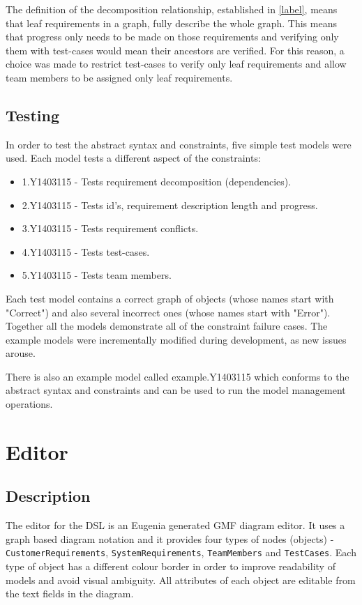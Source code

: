 \documentclass[11pt,a4paper]{article}
\begin{document}
	The definition of the decomposition relationship, established in \autoref{label}, means that leaf requirements in a graph, fully describe the whole graph. This means that progress only needs to be made on those requirements and verifying only them with test-cases would mean their ancestors are verified. For this reason, a choice was made to restrict test-cases to verify only leaf requirements and allow team members to be assigned only leaf requirements.  
	
	\subsection{Testing} \label{sec:tests}
	In order to test the abstract syntax and constraints, five simple test models were used. Each model tests a different aspect of the constraints:
	
	\begin{itemize}[noitemsep]
		\item 1.Y1403115 - Tests requirement decomposition (dependencies).
		\item 2.Y1403115 - Tests id's, requirement description length and progress.
		\item 3.Y1403115 - Tests requirement conflicts.
		\item 4.Y1403115 - Tests test-cases.
		\item 5.Y1403115 - Tests team members.
	\end{itemize}
	
	Each test model contains a correct graph of objects (whose names start with "Correct") and also several incorrect ones (whose names start with "Error"). Together all the models demonstrate all of the constraint failure cases. The example models were incrementally modified during development, as new issues arouse. 
	
	There is also an example model called example.Y1403115 which conforms to the abstract syntax and constraints and can be used to run the model management operations.
	
	\section{Editor} \label{sec:editor}
	
	\subsection{Description}
	The editor for the DSL is an Eugenia \cite{eugenia} generated GMF \cite{gmf} diagram editor. It uses a graph based diagram notation and it provides four types of nodes (objects) - \texttt{CustomerRequirements}, \texttt{SystemRequirements}, \texttt{TeamMembers} and \texttt{TestCases}. Each type of object has a different colour border in order to improve readability of models and avoid visual ambiguity. All attributes of each object are editable from the text fields in the diagram.
	
\end{document}
